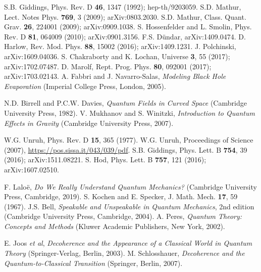 \documentclass[aps,prd,onecolumn,groupedaddress,showkeys,12pt]{revtex4-2}
\begin{document}
 





\begin{thebibliography}{99}

S.B. Giddings, Phys. Rev. D {\bf 46}, 1347 (1992); hep-th/9203059. 
S.D. Mathur, Lect. Notes Phys. {\bf 769}, 3 (2009); arXiv:0803.2030.
S.D. Mathur, Class. Quant. Grav. {\bf 26}, 224001 (2009); arXiv:0909.1038.
S. Hossenfelder and L. Smolin, Phys. Rev. D {\bf 81}, 064009 (2010); arXiv:0901.3156.
F.S. D\"undar, arXiv:1409.0474.
D. Harlow, Rev. Mod. Phys. {\bf 88}, 15002 (2016); arXiv:1409.1231.
J. Polchinski, arXiv:1609.04036.
S. Chakraborty and K. Lochan, Universe {\bf 3}, 55 (2017); arXiv:1702.07487.
D. Marolf, Rept. Prog. Phys. {\bf 80}, 092001 (2017); arXiv:1703.02143.
A. Fabbri and J. Navarro-Salas, {\it Modeling Black Hole Evaporation}
(Imperial College Press, London, 2005).

N.D. Birrell and P.C.W. Davies, {\it Quantum Fields in Curved Space} (Cambridge University Press, 1982).
V. Mukhanov and S. Winitzki, {\it Introduction to Quantum Effects in Gravity} (Cambridge University Press, 2007).

W.G. Unruh, Phys. Rev. D {\bf 15}, 365 (1977).
W.G. Unruh, Proceedings of Science (2007), \url{https://pos.sissa.it/043/039/pdf}.
S.B. Giddings, Phys. Lett. B {\bf 754}, 39 (2016); arXiv:1511.08221.
S. Hod, Phys. Lett. B {\bf 757}, 121 (2016); arXiv:1607.02510.

F. Lalo\"e, {\it Do We Really Understand Quantum Mechanics?} (Cambridge University Press, Cambridge, 2019).
S. Kochen and E. Specker, J. Math. Mech. {\bf 17}, 59 (1967).
J.S. Bell, {\it Speakable and Unspeakable in Quantum Mechanics}, 
2nd edition (Cambridge University Press, Cambridge, 2004).
A. Peres, {\it Quantum Theory: Concepts and Methods} (Kluwer Academic Publishers, New York, 2002).

E. Joos {\it et al}, {\it Decoherence and the Appearance of a Classical World in Quantum Theory}
(Springer-Verlag, Berlin, 2003).
M. Schlosshauer, {\it Decoherence and the Quantum-to-Classical Transition}
(Springer, Berlin, 2007).


\end{thebibliography}
\end{document}
